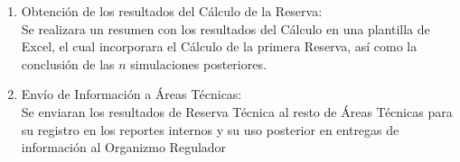 \documentclass[11pt,twoside,openright,spanish]{report}
\numberwithin{equation}{chapter}
\numberwithin{figure}{chapter}
\numberwithin{table}{chapter}
\begin{document}
\begin{singlespace}
\begin{enumerate}
\begin{enumerate}
\begin{enumerate}
				\item Obtención de los resultados del Cálculo de la Reserva:\\ \-\hspace{0.5cm}
				Se realizara un resumen con los resultados del Cálculo en una plantilla de Excel, el cual incorporara el Cálculo de la primera Reserva, así como la conclusión de las $n$ simulaciones posteriores.
				\item Envío de Información a Áreas Técnicas:\\ \-\hspace{0.5cm}
				 Se enviaran los resultados de Reserva Técnica al resto de Áreas Técnicas para su registro en los reportes internos y su uso posterior en entregas de información al Organizmo Regulador\\
				

\end{enumerate}
\end{enumerate}
\end{enumerate}
\end{singlespace}
\end{document}
